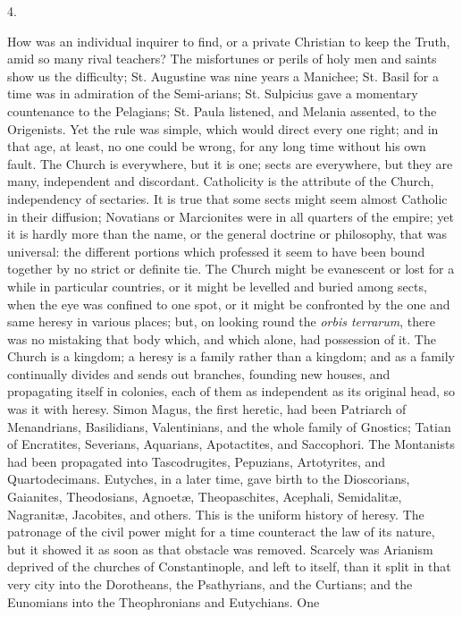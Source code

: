 4.

How was an individual inquirer to find, or a private
Christian to keep the Truth, amid so many rival teachers?
The misfortunes or perils of holy men and saints show us
the difficulty; St. Augustine was nine years a Manichee;
St. Basil for a time was in admiration of the
Semi-arians; St. Sulpicius gave a momentary countenance
to the Pelagians; St. Paula listened, and Melania
assented, to the Origenists. Yet the rule was simple,
which would direct every one right; and in that age, at
least, no one could be wrong, for any long time without
his own fault. The Church is everywhere, but it is one;
sects are everywhere, but they are many, independent and
discordant. Catholicity is the attribute of the Church,
independency of sectaries. It is true that some sects
might seem almost Catholic in their diffusion; Novatians
or Marcionites were in all quarters of the empire; yet it
is hardly more than the name, or the general doctrine or
philosophy, that was universal: the different portions
which professed it seem to have been bound together by no
strict or definite tie. The Church might be evanescent or
lost for a while in particular countries, or it might be
levelled and buried among sects, when the eye was
confined to one spot, or it might be confronted by the
one and same heresy in various places; but, on looking
round the \emph{orbis terrarum}, there was no mistaking
that body which, and which alone, had possession of it.
The Church is a kingdom; a heresy is a family rather than
a kingdom; and as a family continually divides and sends
out branches, founding new houses, and propagating itself
in colonies, each of them as independent as its original
head, so was it with heresy. Simon Magus, the first
heretic, had been Patriarch of Menandrians, Basilidians,
Valentinians, and the whole family of Gnostics; Tatian of
Encratites, Severians, Aquarians, Apotactites, and
Saccophori. The Montanists had been propagated into
Tascodrugites, Pepuzians, Artotyrites, and
Quartodecimans. Eutyches, in a later time, gave birth to
the Dioscorians, Gaianites, Theodosians, Agnoetæ, Theopaschites,
Acephali, Semidalitæ, Nagranitæ, Jacobites, and others. This is the uniform history of
heresy. The patronage of the civil power might for a time
counteract the law of its nature, but it showed it as
soon as that obstacle was removed. Scarcely was Arianism
deprived of the churches of Constantinople, and left to
itself, than it split in that very city into the
Dorotheans, the Psathyrians, and the Curtians; and the
Eunomians into the Theophronians and Eutychians. One
